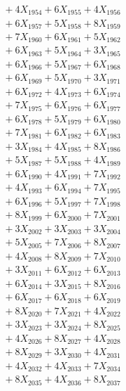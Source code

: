 \documentclass[a4paper,10pt]{article}
\begin{document}
{\begin{align}
&\;  + 4 X_{1954} + 6 X_{1955} + 4 X_{1956} \\[0.3ex]
&\;  + 6 X_{1957} + 5 X_{1958} + 8 X_{1959} \\[0.5ex]\allowbreak
&\;  + 7 X_{1960} + 6 X_{1961} + 5 X_{1962} \\[0.3ex]
&\;  + 6 X_{1963} + 5 X_{1964} + 3 X_{1965} \\[0.3ex]
&\;  + 6 X_{1966} + 5 X_{1967} + 6 X_{1968} \\[0.3ex]
&\;  + 6 X_{1969} + 5 X_{1970} + 3 X_{1971} \\[0.3ex]
&\;  + 6 X_{1972} + 4 X_{1973} + 6 X_{1974} \\[0.3ex]
&\;  + 7 X_{1975} + 6 X_{1976} + 6 X_{1977} \\[0.3ex]
&\;  + 6 X_{1978} + 5 X_{1979} + 6 X_{1980} \\[0.3ex]
&\;  + 7 X_{1981} + 6 X_{1982} + 6 X_{1983} \\[0.3ex]
&\;  + 3 X_{1984} + 4 X_{1985} + 8 X_{1986} \\[0.3ex]
&\;  + 5 X_{1987} + 5 X_{1988} + 4 X_{1989} \\[0.5ex]\allowbreak
&\;  + 6 X_{1990} + 4 X_{1991} + 7 X_{1992} \\[0.3ex]
&\;  + 4 X_{1993} + 6 X_{1994} + 7 X_{1995} \\[0.3ex]
&\;  + 6 X_{1996} + 5 X_{1997} + 7 X_{1998} \\[0.3ex]
&\;  + 8 X_{1999} + 6 X_{2000} + 7 X_{2001} \\[0.3ex]
&\;  + 3 X_{2002} + 3 X_{2003} + 3 X_{2004} \\[0.3ex]
&\;  + 5 X_{2005} + 7 X_{2006} + 8 X_{2007} \\[0.3ex]
&\;  + 4 X_{2008} + 8 X_{2009} + 7 X_{2010} \\[0.3ex]
&\;  + 3 X_{2011} + 6 X_{2012} + 6 X_{2013} \\[0.3ex]
&\;  + 6 X_{2014} + 3 X_{2015} + 8 X_{2016} \\[0.3ex]
&\;  + 6 X_{2017} + 6 X_{2018} + 6 X_{2019} \\[0.5ex]\allowbreak
&\;  + 8 X_{2020} + 7 X_{2021} + 4 X_{2022} \\[0.3ex]
&\;  + 3 X_{2023} + 3 X_{2024} + 8 X_{2025} \\[0.3ex]
&\;  + 4 X_{2026} + 8 X_{2027} + 4 X_{2028} \\[0.3ex]
&\;  + 8 X_{2029} + 3 X_{2030} + 4 X_{2031} \\[0.3ex]
&\;  + 4 X_{2032} + 4 X_{2033} + 7 X_{2034} \\[0.3ex]
&\;  + 8 X_{2035} + 4 X_{2036} + 8 X_{2037} \\[0.3ex]

\end{align}}
\end{document}
